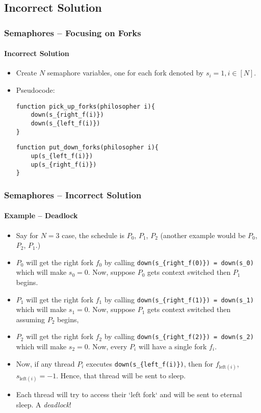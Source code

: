 \documentclass[aspectratio=169, handout, 10pt]{beamer}
\theoremstyle{example}
\begin{document}
\subsection{Incorrect Solution}
\begin{frame}[fragile]\frametitle{Semaphores -- Focusing on Forks}\framesubtitle{Incorrect Solution}{\label{sec:sic}}
  \begin{itemize}
  \pause\item Create $N$ semaphore variables, one for each fork denoted by $s_i = 1, i \in [N]$.
    \pause\item Pseudocode:
\begin{Verbatim}[frame=single]
function pick_up_forks(philosopher i){
    down(s_{right_f(i)})
    down(s_{left_f(i)})
}
\end{Verbatim}

\begin{Verbatim}[frame=single]
function put_down_forks(philosopher i){
    up(s_{left_f(i)})
    up(s_{right_f(i)})
}
\end{Verbatim}
  \end{itemize}
\end{frame}
\begin{frame}[fragile]\frametitle{Semaphores -- Incorrect Solution}\framesubtitle{Example -- Deadlock}
  \begin{example}
  \begin{itemize}
  \pause\item Say for $N=3$ case, the schedule is $P_0$, $P_1$, $P_2$ (another example would be $P_0$, $P_2$, $P_1.$)
  \pause\item $P_0$ will get the right fork $f_0$ by calling \verb!down(s_{right_f(0)}) = down(s_0)! which will make $s_0=0$. Now, suppose $P_0$ gets context switched then $P_1$ begins.
  \pause\item $P_1$ will get the right fork $f_1$ by calling \verb!down(s_{right_f(1)}) = down(s_1)! which will make $s_1=0$. Now, suppose $P_1$ gets context switched then assuming $P_2$ begins,
  \pause\item $P_2$ will get the right fork $f_2$ by calling \verb!down(s_{right_f(2)}) = down(s_2)! which will make $s_2=0$. Now, every $P_i$ will have a single fork $f_i$.
  \pause\item Now, if any thread $P_i$ executes \verb!down(s_{left_f(i)})!, then for $f_{\text{left}(i)}$, $s_{\text{left}(i)} = -1$. Hence, that thread will be sent to sleep.
  \pause\item Each thread will try to access their `left fork` and will be sent to eternal sleep. A \emph{deadlock}!
  \end{itemize}
  \end{example}
\end{frame}
\end{document}
